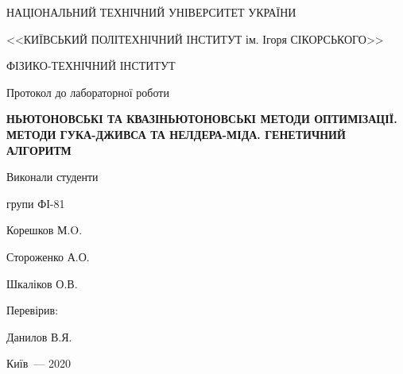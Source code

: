 \thispagestyle{empty}

\begin{center}
НАЦІОНАЛЬНИЙ ТЕХНІЧНИЙ УНІВЕРСИТЕТ УКРАЇНИ \par
<<КИЇВСЬКИЙ ПОЛІТЕХНІЧНИЙ ІНСТИТУТ ім. Ігоря СІКОРСЬКОГО>>\par
ФІЗИКО-ТЕХНІЧНИЙ ІНСТИТУТ\par

\vspace{5cm}
{\huge Протокол до лабораторної роботи \par}

\huge\MakeUppercase{\textbf{ Ньютоновські та квазіньютоновські методи
оптимізації. Методи Гука-Дживса та Нелдера-Міда.
Генетичний алгоритм}} \par
\end{center}

\vspace{1.5cm}
\begin{flushright}
Виконали студенти

групи ФІ-81

\bigbreak

Корешков М.O.

Стороженко А.О.

Шкаліков О.В.

\vspace{20mm}
Перевірив:

Данилов В.Я.

\end{flushright}

\vspace{3cm}
\begin{center}
{Київ~--- 2020}
\end{center}

\newpage
